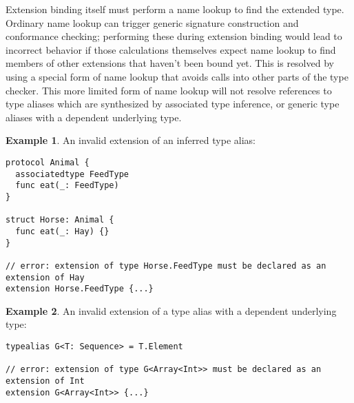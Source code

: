 \documentclass[a4paper,headsepline,bibliography=totoc,toc=flat,fleqn,twoside=semi]{scrbook}
\theoremstyle{definition}
\theoremstyle{definition}
\newtheorem{example}{Example}[chapter]
\theoremstyle{definition}
\begin{document}
Extension binding itself must perform a name lookup to find the extended type. Ordinary name lookup can trigger generic signature construction and conformance checking; performing these during extension binding would lead to incorrect behavior if those calculations themselves expect name lookup to find members of other extensions that haven't been bound yet. This is resolved by using a special form of name lookup that avoids calls into other parts of the type checker. This more limited form of name lookup will not resolve references to type aliases which are synthesized by associated type inference, or generic type aliases with a dependent underlying type.

\begin{example}\label{bad extension 1} An invalid extension of an inferred type alias:
\begin{Verbatim}
protocol Animal {
  associatedtype FeedType
  func eat(_: FeedType)
}

struct Horse: Animal {
  func eat(_: Hay) {}
}

// error: extension of type Horse.FeedType must be declared as an extension of Hay
extension Horse.FeedType {...}
\end{Verbatim}
\end{example}
\begin{example}\label{bad extension 2}
An invalid extension of a type alias with a dependent underlying type:
\begin{Verbatim}
typealias G<T: Sequence> = T.Element

// error: extension of type G<Array<Int>> must be declared as an extension of Int
extension G<Array<Int>> {...}
\end{Verbatim}
\end{example}
\end{document}
